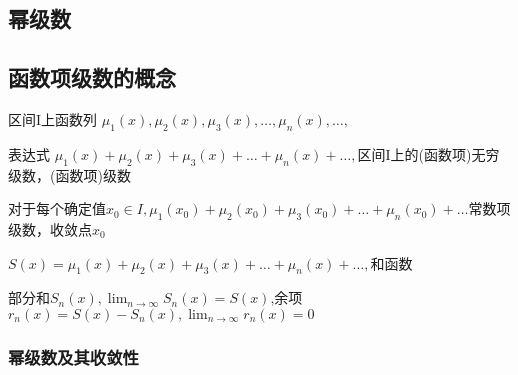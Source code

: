 \documentclass[UTF8]{ctexart}
\newcommand{\mf}[1]{\left( #1\right)}
\newcommand{\mfa}[1]{\left| #1\right|}
\newcommand{\ma}[1]{\begin{array}{llll} #1 \end{array}}
\newcommand{\tp}[1]{\begin{tikzpicture}  #1 \end{tikzpicture}}
\newcommand{\tpo}[2]{\coordinate  %
 (#1) at #2; }
\newcommand{\da}[2]{\frac{\partial #1}{\partial #2}}
\begin{document}
\newpage
\subsection{幂级数}

\subsection{函数项级数的概念}


区间I上函数列 $\mu_1\mf{x},\mu_2\mf{x},\mu_3\mf{x} ,\dots,\mu_n\mf{x},\dots,$

表达式 $\mu_1\mf{x}+\mu_2\mf{x}+\mu_3\mf{x} +\dots+\mu_n\mf{x}+\dots,$区间I上的(函数项)无穷级数，(函数项)级数


对于每个确定值$x_0 \in I,\mu_1\mf{x_0}+\mu_2\mf{x_0}+\mu_3\mf{x_0} +\dots+\mu_n\mf{x_0}+\dots$常数项级数，收敛点$x_0$

$S\mf{x}=\mu_1\mf{x}+\mu_2\mf{x}+\mu_3\mf{x} +\dots+\mu_n\mf{x}+\dots,$和函数

部分和$S_n\mf{x},\lim_{n \rightarrow \infty}S_n\mf{x}=S\mf{x}$,余项$r_n\mf{x}=S\mf{x}-S_n\mf{x},\lim_{n \rightarrow \infty}r_n\mf{x}=0$


\subsubsection{幂级数及其收敛性}





















 


\end{document}
